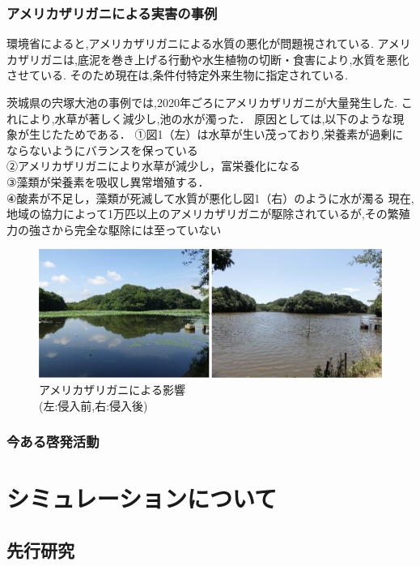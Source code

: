 \documentclass[12pt,a4j,titlepage]{ltjsarticle}
\begin{document}
\subsubsection{アメリカザリガニによる実害の事例}
環境省によると,アメリカザリガニによる水質の悪化が問題視されている.
アメリカザリガニは,底泥を巻き上げる行動や水生植物の切断・食害により,水質を悪化させている.
そのため現在は,条件付特定外来生物に指定されている.　

茨城県の宍塚大池の事例では,2020年ごろにアメリカザリガニが大量発生した.
これにより,水草が著しく減少し,池の水が濁った．
原因としては,以下のような現象が生じたためである．
①図1（左）は水草が生い茂っており,栄養素が過剰にならないようにバランスを保っている\\
②アメリカザリガニにより水草が減少し，富栄養化になる\\
③藻類が栄養素を吸収し異常増殖する．\\
④酸素が不足し，藻類が死滅して水質が悪化し図1（右）のように水が濁る
現在,地域の協力によって1万匹以上のアメリカザリガニが駆除されているが,その繁殖力の強さから完全な駆除には至っていない

\begin{figure}[h]
\begin{center}
  \includegraphics[width=.95\columnwidth]{新・水質.jpg}
\end{center}
  \caption{アメリカザリガニによる影響\\(左:侵入前,右:侵入後)}
  \label{fig:切り替え}
\end{figure}

\subsubsection{今ある啓発活動}

\clearpage
\section{シミュレーションについて}

\subsection{先行研究}
\end{document}
